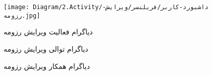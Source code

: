 \begin{figure}[H]
	\texttt{[image: Diagram/2.Activity/داشبورد-کاربر/فریلنسر/ویرایش-رزومه.jpg]}
	\centering
	\caption{دیاگرام فعالیت ویرایش رزومه}
	\label{fig:a:ویرایش-رزومه}
\end{figure}
\begin{figure}[H]
	\caption{دیاگرام توالی ویرایش رزومه}
	\centering
	\label{fig:s:ویرایش-رزومه}
\end{figure}
\begin{figure}[H]
	\centering
	\caption{دیاگرام همکار ویرایش رزومه}
	\label{fig:c:ویرایش-رزومه}
\end{figure}